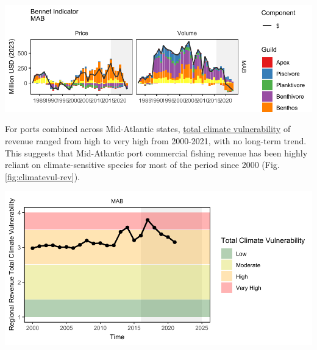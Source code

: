 \documentclass[
  10pt,
]{article}
\let\origfigure\figure
\let\endorigfigure\endfigure
\renewenvironment{figure}[1][2] {
    \expandafter\origfigure\expandafter[H]
} {
    \endorigfigure
}
\begin{document}
\begin{figure}

{\centering \includegraphics{midatlantic_files/figure-latex/bennet-all-1} 

}

\caption{Total price and volume indicators in 2023 dollars (black) for commercial landings, and individual guild contributions to each indicator, in the Mid-Atlantic Bight.}\label{fig:bennet-all}
\end{figure}

For ports combined across Mid-Atlantic states, \href{https://noaa-edab.github.io/catalog/community_climate_vulnerability.html}{total climate vulnerability} of revenue ranged from high to very high from 2000-2021, with no long-term trend. This suggests that Mid-Atlantic port commercial fishing revenue has been highly reliant on climate-sensitive species for most of the period since 2000 (Fig. \ref{fig:climatevul-rev}).

\begin{figure}

{\centering \includegraphics{midatlantic_files/figure-latex/climatevul-rev-1} 

}

\caption{Mid-Atlantic region total climate vulnerability of commercial revenue (sum of Mid-Atlantic port revenue weighted by species climate vulnerability from Hare et al. 2016).}\label{fig:climatevul-rev}
\end{figure}
\end{document}
